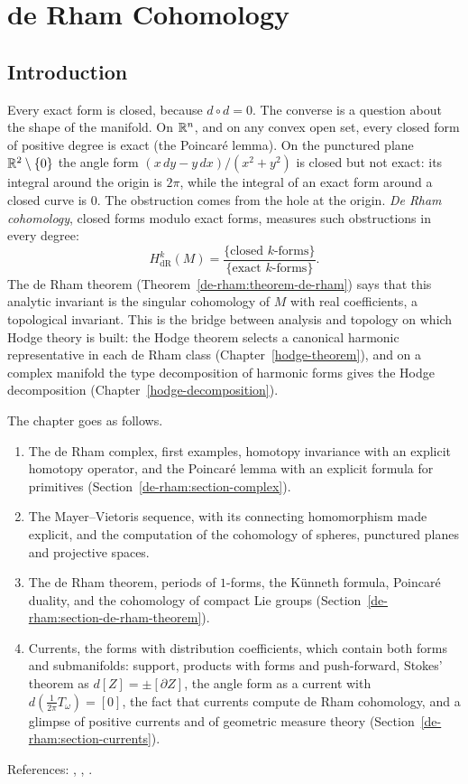 \chapter{de Rham Cohomology}\label{de-rham}

\section{Introduction}\label{de-rham:section-introduction}

Every exact form is closed, because $d \circ d = 0$. The converse is a question about the shape of the manifold. On $\mathbb{R}^n$, and on any convex open set, every closed form of
positive degree is exact (the Poincar\'e lemma). On the punctured plane $\mathbb{R}^2 \setminus \{0\}$ the angle form $(x\,dy - y\,dx)/(x^2 + y^2)$ is closed but not exact: its integral
around the origin is $2\pi$, while the integral of an exact form around a closed curve is $0$. The obstruction comes from the hole at the origin. \emph{De Rham cohomology},
closed forms modulo exact forms, measures such obstructions in every degree:
\[
H^k_{\mathrm{dR}}(M) = \frac{\{\text{closed } k\text{-forms}\}}{\{\text{exact } k\text{-forms}\}} .
\]
The de Rham theorem (Theorem~\ref{de-rham:theorem-de-rham}) says that this analytic invariant is the singular cohomology of $M$ with real coefficients, a topological invariant.
This is the bridge between analysis and topology on which Hodge theory is built: the Hodge theorem selects a canonical harmonic representative in each de Rham class
(Chapter~\ref{hodge-theorem}), and on a complex manifold the type decomposition of harmonic forms gives the Hodge decomposition (Chapter~\ref{hodge-decomposition}).

The chapter goes as follows.
\begin{enumerate}
\item The de Rham complex, first examples, homotopy invariance with an explicit homotopy operator, and the Poincar\'e lemma with an explicit formula for primitives
(Section~\ref{de-rham:section-complex}).
\item The Mayer--Vietoris sequence, with its connecting homomorphism made explicit, and the computation of the cohomology of spheres, punctured planes and projective spaces.
\item The de Rham theorem, periods of $1$-forms, the K\"unneth formula, Poincar\'e duality, and the cohomology of compact Lie groups
(Section~\ref{de-rham:section-de-rham-theorem}).
\item Currents, the forms with distribution coefficients, which contain both forms and submanifolds: support, products with forms and push-forward, Stokes' theorem as $d[Z] = \pm[\partial Z]$, the
angle form as a current with $d(\frac{1}{2\pi}T_\omega) = [0]$, the fact that currents compute de Rham cohomology, and a glimpse of positive currents and of geometric measure theory
(Section~\ref{de-rham:section-currents}).
\end{enumerate}
References: \cite{bott-tu}, \cite{warner-foundations}, \cite[Chapter 0]{griffiths-harris}.

